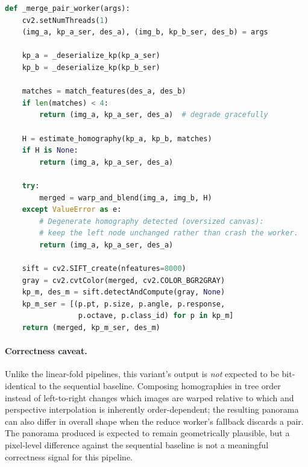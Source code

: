 \documentclass[10pt,twocolumn,letterpaper]{article}
\begin{document}
\begin{lstlisting}[language=Python, basicstyle=\small\ttfamily, breaklines=true, breakatwhitespace=true, frame=single, caption={Reduce phase worker: an atomic merge unit}, label={lst:merge-worker}]
def _merge_pair_worker(args):
    cv2.setNumThreads(1)
    (img_a, kp_a_ser, des_a), (img_b, kp_b_ser, des_b) = args

    kp_a = _deserialize_kp(kp_a_ser)
    kp_b = _deserialize_kp(kp_b_ser)

    matches = match_features(des_a, des_b)
    if len(matches) < 4:
        return (img_a, kp_a_ser, des_a)  # degrade gracefully

    H = estimate_homography(kp_a, kp_b, matches)
    if H is None:
        return (img_a, kp_a_ser, des_a)

    try:
        merged = warp_and_blend(img_a, img_b, H)
    except ValueError as e:
        # Degenerate homography detected (oversized canvas):
        # keep the left node unchanged rather than crash the worker.
        return (img_a, kp_a_ser, des_a)

    sift = cv2.SIFT_create(nfeatures=8000)
    gray = cv2.cvtColor(merged, cv2.COLOR_BGR2GRAY)
    kp_m, des_m = sift.detectAndCompute(gray, None)
    kp_m_ser = [(p.pt, p.size, p.angle, p.response,
                 p.octave, p.class_id) for p in kp_m]
    return (merged, kp_m_ser, des_m)
\end{lstlisting}

\paragraph{Correctness caveat.}
Unlike the linear-fold pipelines, this variant's output is \emph{not} expected to be
bit-identical to the sequential baseline. Composing homographies in tree order instead of
left-to-right changes which images are warped relative to which and perspective
interpolation is inherently order-dependent; the resulting panorama can also differ in
overall shape when the reduce worker's fallback discards a pair. The panorama produced is
expected to remain geometrically plausible, but a pixel-level difference against the sequential
baseline is not a meaningful correctness signal for this pipeline.
\end{document}
